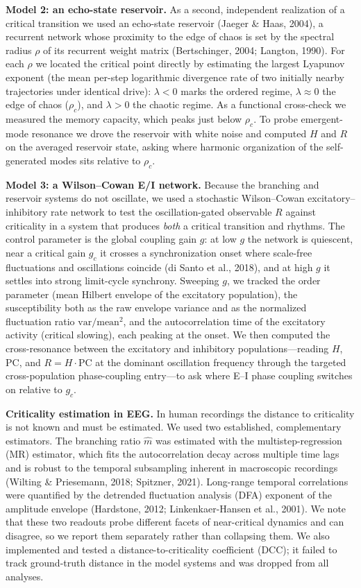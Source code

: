\documentclass[11pt]{article}
\begin{document}
\textbf{Model 2: an echo-state reservoir.} As a second, independent realization of a critical transition we used an echo-state reservoir (Jaeger \& Haas, 2004), a recurrent network whose proximity to the edge of chaos is set by the spectral radius $\rho$ of its recurrent weight matrix (Bertschinger, 2004; Langton, 1990). For each $\rho$ we located the critical point directly by estimating the largest Lyapunov exponent (the mean per-step logarithmic divergence rate of two initially nearby trajectories under identical drive): $\lambda<0$ marks the ordered regime, $\lambda\approx0$ the edge of chaos ($\rho_c$), and $\lambda>0$ the chaotic regime. As a functional cross-check we measured the memory capacity, which peaks just below $\rho_c$. To probe emergent-mode resonance we drove the reservoir with white noise and computed $H$ and $R$ on the averaged reservoir state, asking where harmonic organization of the self-generated modes sits relative to $\rho_c$.

\textbf{Model 3: a Wilson--Cowan E/I network.} Because the branching and reservoir systems do not oscillate, we used a stochastic Wilson--Cowan excitatory--inhibitory rate network to test the oscillation-gated observable $R$ against criticality in a system that produces \emph{both} a critical transition and rhythms. The control parameter is the global coupling gain $g$: at low $g$ the network is quiescent, near a critical gain $g_c$ it crosses a synchronization onset where scale-free fluctuations and oscillations coincide (di Santo et al., 2018), and at high $g$ it settles into strong limit-cycle synchrony. Sweeping $g$, we tracked the order parameter (mean Hilbert envelope of the excitatory population), the susceptibility both as the raw envelope variance and as the normalized fluctuation ratio $\mathrm{var}/\mathrm{mean}^2$, and the autocorrelation time of the excitatory activity (critical slowing), each peaking at the onset. We then computed the cross-resonance between the excitatory and inhibitory populations---reading $H$, $\mathrm{PC}$, and $R=H\cdot\mathrm{PC}$ at the dominant oscillation frequency through the targeted cross-population phase-coupling entry---to ask where E--I phase coupling switches on relative to $g_c$.

\textbf{Criticality estimation in EEG.} In human recordings the distance to criticality is not known and must be estimated. We used two established, complementary estimators. The branching ratio $\hat m$ was estimated with the multistep-regression (MR) estimator, which fits the autocorrelation decay across multiple time lags and is robust to the temporal subsampling inherent in macroscopic recordings (Wilting \& Priesemann, 2018; Spitzner, 2021). Long-range temporal correlations were quantified by the detrended fluctuation analysis (DFA) exponent of the amplitude envelope (Hardstone, 2012; Linkenkaer-Hansen et al., 2001). We note that these two readouts probe different facets of near-critical dynamics and can disagree, so we report them separately rather than collapsing them. We also implemented and tested a distance-to-criticality coefficient (DCC); it failed to track ground-truth distance in the model systems and was dropped from all analyses.
\end{document}
